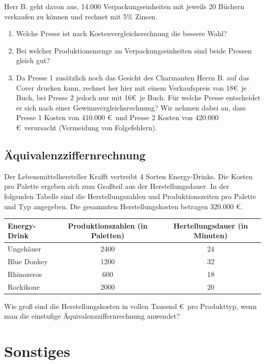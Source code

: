 \documentclass[11pt, a4paper]{article}
\begin{document}
\vspace{\baselineskip}
Herr B. geht davon aus, 14.000 Verpackungseinheiten mit jeweils 20 Büchern verkaufen zu können und rechnet mit 5\% Zinsen.

\begin{enumerate}
	\item Welche Presse ist nach Kostenvergleichsrechnung die bessere Wahl?
	\item Bei welcher Produktionsmenge an Verpackungseinheiten sind beide Pressen gleich gut?
	\item Da Presse 1 zusätzlich noch das Gesicht des Charmanten Herrn B. auf das Cover drucken kann, rechnet her hier mit einem Verkaufspreis von 18\euro \ je Buch, bei Presse 2 jedoch nur mit 16\euro \ je Buch. Für welche Presse entscheidet er sich nach einer Gewinnvergleichsrechnung? Wir nehmen dabei an, dass Presse 1 Kosten von 410.000 \euro \ und Presse 2 Kosten von 420.000 \euro \ verursacht (Vermeidung von Folgefehlern).
\end{enumerate}

\subsection{Äquivalenzziffernrechnung}
Der Lebensmittelhersteller Krafft vertreibt 4 Sorten Energy-Drinks. Die Kosten pro Palette ergeben sich zum Großteil aus der Herstellungsdauer. In der folgenden Tabelle sind die Herstellungszahlen und Produktionszeiten pro Palette und Typ angegeben. Die gesammten Herstellungskosten betragen 320.000 \euro.

\begin{tabular}{lcc}
	Energy-Drink & Produktionszahlen (in Paletten) & Hertellungsdauer (in Minuten) \\ \hline
	Ungehäuer & 2400 & 24 \\
	Blue Donkey & 1200 & 32 \\
	Rhinozeros & 600 & 18 \\
	Rockikone & 2000 & 20
\end{tabular}

\vspace{\baselineskip}
Wie groß sind die Herstellungskosten in vollen Tausend \euro \ pro Produkttyp, wenn man die einstufige Äquivalenzziffernrechnung anwendet?

\newpage
\section{Sonstiges}
\end{document}
